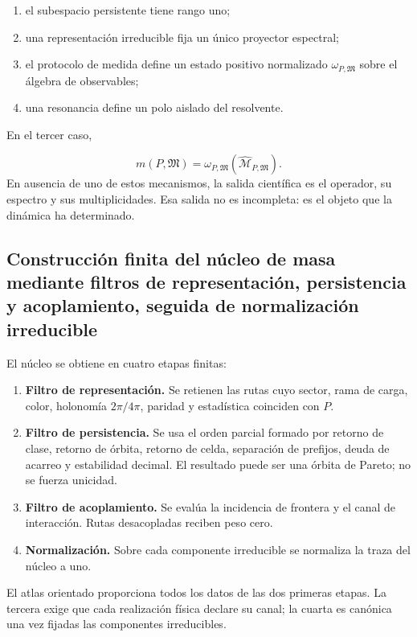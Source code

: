 \begin{enumerate}
\item el subespacio persistente tiene rango uno;
\item una representación irreducible fija un único proyector espectral;
\item el protocolo de medida define un estado positivo normalizado
\(\omega_{P,\mathfrak M}\) sobre el álgebra de observables;

\item una resonancia define un polo aislado del resolvente.
\end{enumerate}
En el tercer caso,

\[
 m(P,\mathfrak M)
 =\omega_{P,\mathfrak M}
  (\widehat{\mathcal M}_{P,\mathfrak M}).
\]
En ausencia de uno de estos mecanismos, la salida científica es el operador, su espectro y sus multiplicidades. Esa salida no es incompleta: es el objeto que la dinámica ha determinado.

\subsection{Construcción finita del núcleo de masa mediante filtros de representación, persistencia y acoplamiento, seguida de normalización irreducible}
El núcleo se obtiene en cuatro etapas finitas:

\begin{enumerate}
\item \textbf{Filtro de representación.} Se retienen las rutas cuyo sector, rama de carga,
color, holonomía \(2\pi/4\pi\), paridad y estadística coinciden con \(P\).

\item \textbf{Filtro de persistencia.} Se usa el orden parcial formado por retorno de clase,
retorno de órbita, retorno de celda, separación de prefijos, deuda de acarreo y estabilidad decimal. El resultado puede ser una órbita de Pareto; no se fuerza unicidad.

\item \textbf{Filtro de acoplamiento.} Se evalúa la incidencia de frontera y el canal de
interacción. Rutas desacopladas reciben peso cero.

\item \textbf{Normalización.} Sobre cada componente irreducible se normaliza la traza del
núcleo a uno.

\end{enumerate}
El atlas orientado proporciona todos los datos de las dos primeras etapas. La tercera exige que cada realización física declare su canal; la cuarta es canónica una vez fijadas las componentes irreducibles.

